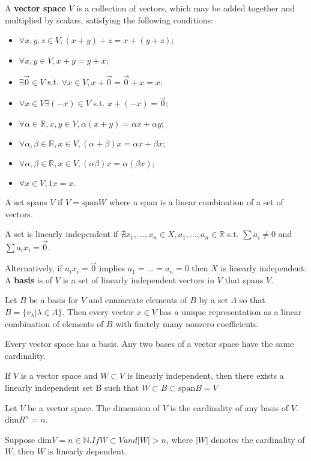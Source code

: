 \documentclass[11pt]{article} %
\begin{document}
A \textbf{vector space} $V$ is a collection of vectors, which may be added together and multiplied by scalars, satisfying the following conditions:
\begin{itemize}
\item $\forall x,y,z \in V, (x+y)+z = x+(y+z)$;
\item $\forall x,y \in V, x+y = y+x$;
\item $\exists \vec{0} \in V$ s.t. $\forall x \in V, x + \vec{0} = \vec{0}+x = x;$
\item $\forall x \in V \exists (-x) \in V$ s.t. $x + (-x) = \vec{0};$
\item $\forall \alpha \in \mathbb{R}, x,y \in V, \alpha (x + y) = \alpha x + \alpha y;$
\item $\forall \alpha, \beta \in \mathbb{R}, x \in V, (\alpha + \beta)x = \alpha x + \beta x;$
\item $\forall \alpha, \beta \in \mathbb{R}, x \in V, (\alpha \beta)x = \alpha  (\beta x);$
\item $\forall x \in V, 1 x = x.$
\end{itemize}

A set spans $V$ if $V = \text{span}W$ where a span is a linear combination of a set of vectors.

A set is linearly independent if $\nexists x_1, \dots, x_n \in X, a_1,\dots, a_n \in \mathbb{R}$ s.t. $\sum a_i  \neq 0$ and $\sum a_i x_i = \vec{0}.$

Alternatively, if $a_i x_i = \vec{0}$ implies $a_1 = \dots =a_n  =0 $ then $X$ is linearly independent. A \textbf{basis} is of $V$ is a set of linearly independent vectors in $V$ that spans $V$.

Let $B$ be a basis for $V$ and enumerate elements of $B$ by a set $\Lambda$ so that $B = \{ v_{\lambda} | \lambda \in \Lambda\}.$ Then every vector $x \in V$ has a unique representation as a linear combination of elements of $B$ with finitely many nonzero coefficients.

Every vector space has a basis. Any two bases of a vector space have the same cardinality.

If $V$ is a vector space and $W \subset V$ is linearly independent, then there exists a linearly independent set B such that $W \subset B \subset \text{span}B = V$

Let $V$ be a vector space. The dimension of $V$ is the cardinality of any basis of $V$. dim$R^n = n.$

Suppose dim$V = n \in \mathbb{N}. If W \subset V and |W|>n$, where $|W|$ denotes the cardinality of $W$, then $W$ is linearly dependent.
\end{document}
